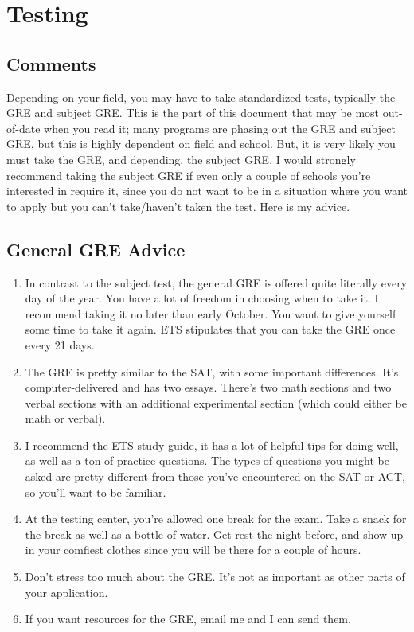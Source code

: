 \documentclass[12pt]{article}
\begin{document}
\section{Testing}
\subsection{Comments}
Depending on your field, you may have to take standardized tests, typically the GRE and subject GRE. This is the part of this document that may be most out-of-date when you read it; many programs are phasing out the GRE and subject GRE, but this is highly dependent on field and school. But, it is very likely you must take the GRE, and depending, the subject GRE. I would strongly recommend taking the subject GRE if even only a couple of schools you're interested in require it, since you do not want to be in a situation where you want to apply but you can't take/haven't taken the test. Here is my advice.
\subsection{General GRE Advice}
\begin{enumerate}
\item In contrast to the subject test, the general GRE is offered quite literally every day of the year. You have a lot of freedom in choosing when to take it. I recommend taking it no later than early October. You want to give yourself some time to take it again. ETS stipulates that you can take the GRE once every 21 days.

\item The GRE is pretty similar to the SAT, with some important differences. It's computer-delivered and has two essays. There's two math sections and two verbal sections with an additional experimental section (which could either be math or verbal). 

\item I recommend the ETS study guide, it has a lot of helpful tips for doing well, as well as a ton of practice questions. The types of questions you might be asked are pretty different from those you've encountered on the SAT or ACT, so you'll want to be familiar.

\item At the testing center, you're allowed one break for the exam. Take a snack for the break as well as a bottle of water. Get rest the night before, and show up in your comfiest clothes since you will be there for a couple of hours.

\item Don't stress too much about the GRE. It's not as important as other parts of your application.

\item If you want resources for the GRE, email me and I can send them.

\end{enumerate}
\end{document}
